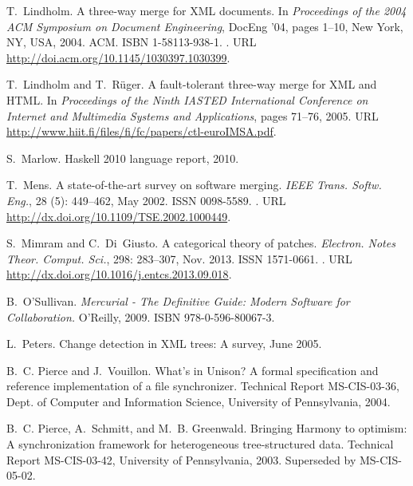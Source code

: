 \documentclass{sigplanconf}
\theoremstyle{plain}
\begin{document}
\begin{thebibliography}{22}
T.~Lindholm.
\newblock A three-way merge for {XML} documents.
\newblock In \emph{Proceedings of the 2004 ACM Symposium on Document
  Engineering}, DocEng '04, pages 1--10, New York, NY, USA, 2004. ACM.
\newblock ISBN 1-58113-938-1.
\newblock {}.
\newblock URL \url{http://doi.acm.org/10.1145/1030397.1030399}.

T.~Lindholm and T.~Rüger.
\newblock A fault-tolerant three-way merge for {XML} and {HTML}.
\newblock In \emph{Proceedings of the Ninth {IASTED} International Conference
  on Internet and Multimedia Systems and Applications}, pages 71--76, 2005.
\newblock URL \url{http://www.hiit.fi/files/fi/fc/papers/ctl-euroIMSA.pdf}.

S.~Marlow.
\newblock Haskell 2010 language report, 2010.

T.~Mens.
\newblock A state-of-the-art survey on software merging.
\newblock \emph{IEEE Trans. Softw. Eng.}, 28 (5): 449--462,
  May 2002.
\newblock ISSN 0098-5589.
\newblock {}.
\newblock URL \url{http://dx.doi.org/10.1109/TSE.2002.1000449}.

S.~Mimram and C.~Di~Giusto.
\newblock A categorical theory of patches.
\newblock \emph{Electron. Notes Theor. Comput. Sci.}, 298: 283--307,
  Nov. 2013.
\newblock ISSN 1571-0661.
\newblock {}.
\newblock URL \url{http://dx.doi.org/10.1016/j.entcs.2013.09.018}.

B.~O'Sullivan.
\newblock \emph{Mercurial - The Definitive Guide: Modern Software for
  Collaboration.}
\newblock O'Reilly, 2009.
\newblock ISBN 978-0-596-80067-3.

L.~Peters.
\newblock Change detection in {XML} trees: A survey, June 2005.

B.~C. Pierce and J.~Vouillon.
\newblock What's in {U}nison? {A} formal specification and reference
  implementation of a file synchronizer.
\newblock Technical Report MS-CIS-03-36, Dept. of Computer and Information
  Science, University of Pennsylvania, 2004.

B.~C. Pierce, A.~Schmitt, and M.~B. Greenwald.
\newblock Bringing {H}armony to optimism: {A} synchronization framework for
  heterogeneous tree-structured data.
\newblock Technical Report MS-CIS-03-42, University of Pennsylvania, 2003.
\newblock Superseded by MS-CIS-05-02.


\end{thebibliography}
\end{document}
